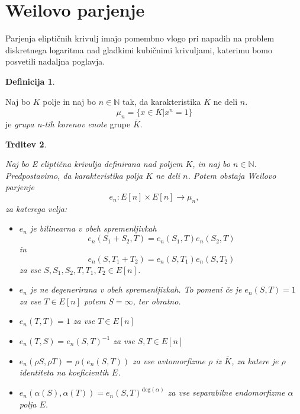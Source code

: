 \documentclass[12pt,a4paper,twoside]{article}
\theoremstyle{definition} %
\newtheorem{definicija}{Definicija}[section]
\theoremstyle{plain} %
\newtheorem{trditev}[definicija]{Trditev}
\numberwithin{equation}{section}  %
\newcommand{\N}{\mathbb N}
\begin{document}
\newpage
\section{Weilovo parjenje}
Parjenja eliptičnih krivulj imajo pomembno vlogo pri napadih na problem diskretnega logaritma nad
gladkimi kubičnimi krivuljami, katerimu bomo posvetili nadaljna poglavja.

\begin{definicija}~

Naj bo $K$ polje in naj bo $n \in \N$ tak, da karakteristika $K$ ne deli $n$.
$$\mu_n = \{ x \in \overline{K} | x^n = 1 \}$$
je \emph{grupa n-tih korenov enote} grupe $\overline{K}$.
\end{definicija}

\begin{trditev}~

\label{trd-WeilPar}
Naj bo E eliptična krivulja definirana nad poljem $K$, in naj bo $n \in \N$. Predpostavimo, da karakteristika polja $K$ ne deli $n$. Potem obstaja Weilovo parjenje
$$e_n:E[n] \times E[n] \rightarrow \mu_n,$$
za katerega velja:
\begin{itemize}
\item $e_n$ je bilinearna v obeh spremenljivkah
$$e_n(S_1+S_2,T) = e_n(S_1,T)e_n(S_2,T)$$
in
$$e_n(S,T_1+T_2) = e_n(S,T_1)e_n(S,T_2)$$
za vse $S,S_1,S_2,T,T_1,T_2 \in E[n]$.
\item $e_n$ je ne degenerirana v obeh spremenljivkah. To pomeni če je $e_n(S,T) = 1$ za vse $T \in E[n]$ potem $S = \infty$, ter obratno.

\item $e_n(T,T) = 1$ za vse $T \in E[n]$

\item $e_n(T,S) = e_n(S,T)^{-1}$ za vse $S,T \in E[n]$

\item $e_n(\rho S,\rho T) = \rho(e_n(S,T))$ za vse avtomorfizme $\rho$ iz $\bar{K}$, za katere je $\rho$ identiteta na koeficientih $E$.

\item $e_n(\alpha(S),\alpha(T)) = e_n(S,T)^{\text{deg}(\alpha)}$ za vse separabilne endomorfizme $\alpha$ polja $E$.
\end{itemize}

\end{trditev}
\end{document}

